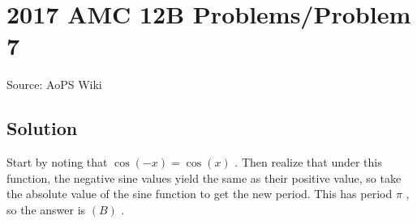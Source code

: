\documentclass[12pt]{article}
\begin{document}
\section*{{2017 AMC 12B Problems/Problem 7}}
Source: AoPS Wiki

\subsection*{Solution}
Start by noting that $\cos(-x)=\cos(x)$ . Then realize that under this function, the negative sine values yield the same as their positive value, so take the absolute value of the sine function to get the new period. This has period $\pi$ , so the answer is $\boxed{(B)}$ .
\end{document}

